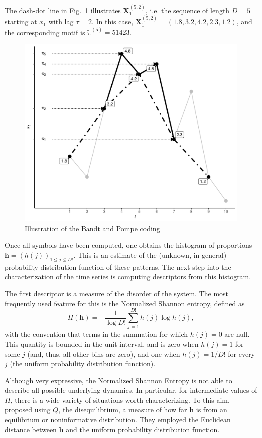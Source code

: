 \documentclass[sts]{imsart}
\begin{document}
The dash-dot line in Fig.~\ref{Fig:IntroBP} illustrates $\mathbf X_{1}^{(5,2)}$, i.e. the sequence of length $D=5$ starting at $x_1$ with lag $\tau=2$.
In this case, $\mathbf X_{1}^{(5,2)}= (1.8, 3.2, 4.2, 2.3, 1.2)$, and the corresponding motif is $\widetilde{\pi}^{(5)}=51423$.

\begin{figure}[hbt]
\centering
\includegraphics[width=.7\linewidth]{IntroBP}
\caption{Illustration of the Bandt and Pompe coding\label{Fig:IntroBP}}
\end{figure}

Once all symbols have been computed, one obtains the histogram of proportions $\bm h = (h(j))_{1\leq j\leq D!}$.
This is an estimate of the (unknown, in general) probability distribution function of these patterns.
The next step into the characterization of the time series is computing descriptors from this histogram.

The first descriptor is a measure of the disorder of the system.
The most frequently used feature for this is the Normalized Shannon entropy, defined as
\begin{equation}
H(\bm h) = -\frac{1}{\log D!} \sum_{j=1}^{D!} h(j) \log h(j),
\end{equation}
with the convention that terms in the summation for which $h(j)=0$ are null.
This quantity is bounded in the unit interval, and is zero when $h(j)=1$ for some $j$ (and, thus, all other bins are zero), and one when $h(j)=1/D!$ for every $j$ (the uniform probability distribution function).

Although very expressive, the Normalized Shannon Entropy is not able to describe all possible underlying dynamics.
In particular, for intermediate values of $H$, there is a wide variety of situations worth characterizing.
To this aim, \citeauthor{LopezRuiz1995}~ proposed using $Q$, the disequilibrium, a measure of how far $\bm h$ is from an equilibrium or noninformative distribution.
They employed the Euclidean distance between $\bm h$ and the uniform probability distribution function.
\end{document}
